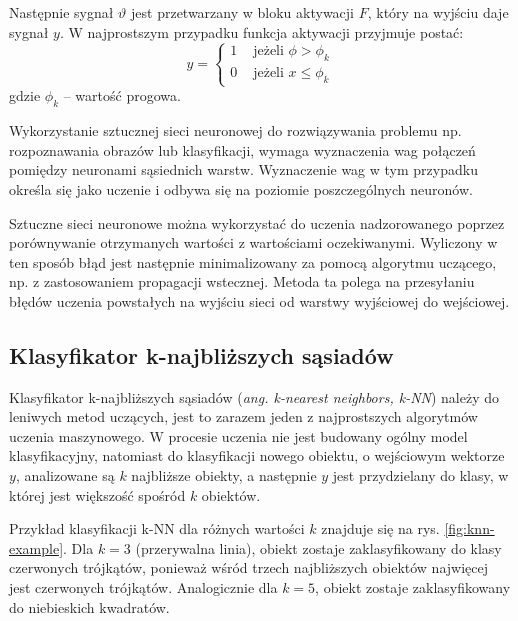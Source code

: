 Następnie sygnał $\vartheta$ jest przetwarzany w bloku aktywacji $F$, który na wyjściu daje sygnał $y$. W najprostszym przypadku funkcja aktywacji przyjmuje postać:
\begin{equation} 
\label{ssn_y} 
y = \begin{cases}
		1 & \text{ jeżeli } \phi > \phi_k \\
		0 & \text{ jeżeli } x \leq \phi_k
	\end{cases} 
\end{equation} gdzie $\phi_k$ -- wartość progowa.

Wykorzystanie sztucznej sieci neuronowej do rozwiązywania problemu np. rozpoznawania obrazów lub klasyfikacji, wymaga wyznaczenia wag połączeń pomiędzy neuronami sąsiednich warstw. Wyznaczenie wag w tym przypadku określa się jako uczenie i odbywa się na poziomie poszczególnych neuronów.

Sztuczne sieci neuronowe można wykorzystać do uczenia nadzorowanego poprzez porównywanie otrzymanych wartości z wartościami oczekiwanymi. Wyliczony w ten sposób błąd jest następnie minimalizowany za pomocą algorytmu uczącego, np. z zastosowaniem propagacji wstecznej. Metoda ta polega na przesyłaniu błędów uczenia powstałych na wyjściu sieci od warstwy wyjściowej do wejściowej.
	
\subsection{Klasyfikator k-najbliższych sąsiadów}
Klasyfikator k-najbliższych sąsiadów (\emph{ang. k-nearest neighbors, k-NN}) należy do leniwych metod uczących, jest to zarazem jeden z najprostszych algorytmów uczenia maszynowego. W procesie uczenia nie jest budowany ogólny model klasyfikacyjny, natomiast do klasyfikacji nowego obiektu, o wejściowym wektorze $y$, analizowane są $k$ najbliższe obiekty, a następnie $y$ jest przydzielany do klasy, w której jest większość spośród $k$ obiektów.\cite{HAND01}

Przykład klasyfikacji k-NN dla różnych wartości $k$ znajduje się na rys. \ref{fig:knn-example}. Dla $k=3$ (przerywalna linia), obiekt zostaje zaklasyfikowany do klasy czerwonych trójkątów, ponieważ wśród trzech najbliższych obiektów najwięcej jest czerwonych trójkątów. Analogicznie dla $k=5$, obiekt zostaje zaklasyfikowany do niebieskich kwadratów.

